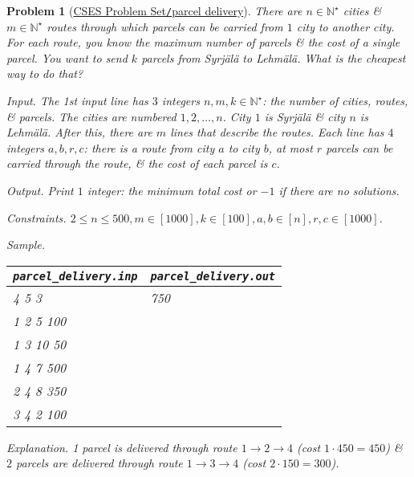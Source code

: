 \documentclass{article}
\newtheorem{problem}{Problem}
\begin{document}
\begin{problem}[\href{https://cses.fi/problemset/task/2121}{CSES Problem Set{\tt/}parcel delivery}]
    There are $n\in\mathbb{N}^\star$ cities \& $m\in\mathbb{N}^\star$ routes through which parcels can be carried from $1$ city to another city. For each route, you know the maximum number of parcels \& the cost of a single parcel. You want to send $k$ parcels from Syrjälä to Lehmälä. What is the cheapest way to do that?
    \item {\sf Input.} The 1st input line has $3$ integers $n,m,k\in\mathbb{N}^\star$: the number of cities, routes, \& parcels. The cities are numbered $1,2,\ldots,n$. City $1$ is Syrjälä \& city $n$ is Lehmälä. After this, there are $m$ lines that describe the routes. Each line has $4$ integers $a,b,r,c$: there is a route from city $a$ to city $b$, at most $r$ parcels can be carried through the route, \& the cost of each parcel is $c$.
    \item {\sf Output.} Print $1$ integer: the minimum total cost or $-1$ if there are no solutions.
    \item {\sf Constraints.} $2\le n\le500,m\in[1000],k\in[100],a,b\in[n],r,c\in[1000]$.
    \item {\sf Sample.}
    \begin{table}[H]
        \centering
        \begin{tabular}{|l|l|}
            \hline
            \verb|parcel_delivery.inp| & \verb|parcel_delivery.out| \\
            \hline
            4 5 3 & 750 \\
            1 2 5 100 & \\
            1 3 10 50 & \\
            1 4 7 500 & \\
            2 4 8 350 & \\
            3 4 2 100 & \\
            \hline
        \end{tabular}
    \end{table}
    \item {\sf Explanation.} 1 parcel is delivered through route $1\to2\to4$ (cost $1\cdot450 = 450$) \& $2$ parcels are delivered through route $1\to3\to4$ (cost $2\cdot150 = 300$).
\end{problem}
\end{document}
